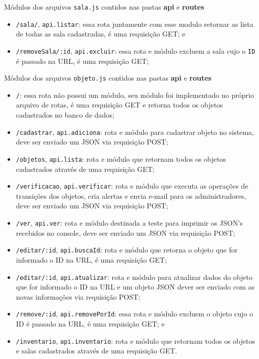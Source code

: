 \par
Módulos dos arquivos \texttt{sala.js} contidos nas pastas \textbf{api} e \textbf{routes}
\begin{itemize}
    \item \texttt{/sala/}, \texttt{api.listar}: essa rota juntamente com esse modulo retornar as lista de todas as sala cadastradas, é uma requisição GET; e

    \item \texttt{/removeSala/:id}, \texttt{api.excluir}: essa rota e módulo excluem a sala cujo o \texttt{ID} é passado na URL, é uma requisição GET;
\end{itemize}


\par
Módulos dos arquivos \texttt{objeto.js} contidos nas pastas \textbf{api} e \textbf{routes}
\begin{itemize}
    \item  \texttt{/}: essa rota não possui um módulo, seu módulo foi implementado no próprio arquivo de rotas, é uma requisição GET e retorna todos os objetos cadastrados no banco de dados;

    \item \texttt{/cadastrar}, \texttt{api.adiciona}: rota e módulo para cadastrar objeto no sistema, deve ser enviado um JSON via requisição POST;

    \item \texttt{/objetos}, \texttt{api.lista}: rota e módulo que retornam todos os objetos cadastrados através de uma requisição GET;

    \item \texttt{/verificacao}, \texttt{api.verificar}: rota e módulo que executa as operações de transições dos objetos, cria alertas e envia e-mail para os administradores, deve ser enviado um JSON via requisição POST;

    \item \texttt{/ver}, \texttt{api.ver}: rota e módulo destinada a teste para imprimir os JSON's recebidos no console, deve ser enviado um JSON via requisição POST;

    \item \texttt{/editar/:id}, \texttt{api.buscaId}: rota e módulo que retorna o  objeto que for informado o ID na URL, é uma requisição GET;

    \item \texttt{/editar/:id}, \texttt{api.atualizar}: rota e módulo para atualizar dados do objeto que for informado o ID na URL e um objeto JSON dever ser enviado com as novas informações via requisição POST;

    \item \texttt{/remove/:id}, \texttt{api.removePorId}: essa rota e módulo excluem o objeto cujo o ID é passado na URL, é uma requisição GET; e
    
    \item \texttt{/inventario}, \texttt{api.inventario}: rota e módulo que retornam todos os objetos e salas cadastrados através de uma requisição GET.

\end{itemize}

